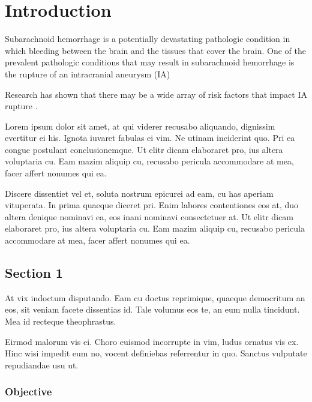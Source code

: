 \cleartooddpage[\thispagestyle{empty}]
\chapter{Introduction}\label{CHAPTER1}

Subarachnoid hemorrhage is a potentially devastating pathologic condition in which bleeding between the brain and the tissues that cover the brain. One of the prevalent pathologic conditions that may result in subarachnoid hemorrhage is the rupture of an intracranial aneurysm (IA)

Research has shown that there may be a wide array of risk factors that impact IA rupture \cite{Korja1958}.


Lorem ipsum dolor sit amet, at qui viderer recusabo aliquando, dignissim 
evertitur ei his. Ignota iuvaret fabulas ei vim. Ne utinam inciderint quo. 
Pri ea congue postulant conclusionemque. Ut elitr dicam elaboraret pro, ius 
altera voluptaria cu. Eam mazim aliquip cu, recusabo pericula accommodare at 
mea, facer affert nonumes qui ea.

Discere dissentiet vel et, soluta nostrum epicurei ad eam, cu has aperiam 
vituperata. In prima quaeque diceret pri. Enim labores contentiones eos at, 
duo altera denique nominavi ea, eos inani nominavi consectetuer at. Ut elitr 
dicam elaboraret pro, ius altera voluptaria cu. Eam mazim aliquip cu, 
recusabo pericula accommodare at mea, facer affert nonumes qui ea.
\cite{Crystal09_01,DMOL3_01,HPL_DGEMM_02}

\section{Section 1}\label{CHAPTER1_SECTION1}

At vix indoctum disputando. Eam cu doctus reprimique, quaeque democritum 
an eos, sit veniam facete dissentias id. Tale volumus eos te, an eum nulla 
tincidunt. Mea id recteque theophrastus.

Eirmod malorum vis ei. Choro euismod incorrupte in vim, ludus ornatus vis ex. 
Hinc wisi impedit eum no, vocent definiebas referrentur in quo. Sanctus 
vulputate repudiandae usu ut.

\subsection{Objective}\label{CHAPTER1_SECTION1_SUBSECTION1}

